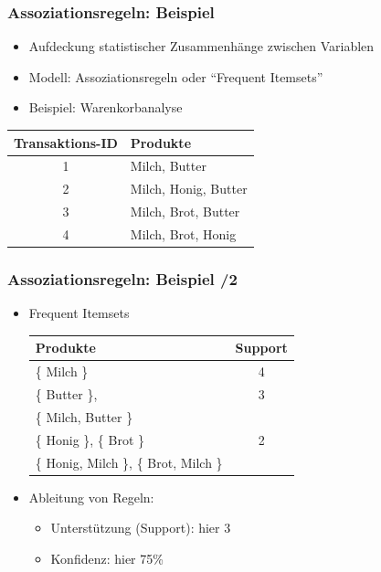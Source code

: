 \begin{frame}
\frametitle{Assoziationsregeln: Beispiel}

\begin{itemize}
  \item Aufdeckung statistischer Zusammenhänge zwischen Variablen
  \item Modell: Assoziationsregeln oder "`Frequent Itemsets"'
\item Beispiel: Warenkorbanalyse
\end{itemize}

\begin{center}
\begin{tabular}{|c|l|}
\rowcolor{Gray}\hline
Transaktions-ID & Produkte \\
\hline
\hline
1 & Milch, Butter \\
2 & Milch, Honig, Butter \\
3 & Milch, Brot, Butter \\
4 & Milch, Brot, Honig \\
\hline
\end{tabular}
\end{center}
\end{frame}


\begin{frame}
\frametitle{Assoziationsregeln: Beispiel /2}

\begin{itemize}
\item Frequent Itemsets

{\small
\begin{center}
\begin{tabular}{|l|c|}
  \rowcolor{Gray}\hline
Produkte & Support \\
\hline
\hline
\{ Milch \} & 4 \\
\hline
\{ Butter \}, & 3 \\
\{ Milch, Butter \} & \\
\hline
\{ Honig \}, \{ Brot \}  & 2 \\
\{ Honig, Milch \},
\{ Brot, Milch \}  & \\
\hline
\end{tabular}\end{center}}

\item Ableitung von Regeln:\\
\begin{itemize}
\item Unterstützung (Support): hier 3
\item Konfidenz: hier 75\%
\end{itemize}
\end{itemize}

\end{frame}

